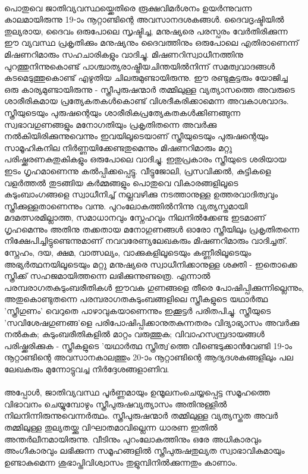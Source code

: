 \paragraph{}പൊതുവെ ജാതിവ്യവസ്ഥയ്ക്കെതിരെ രൂക്ഷവിമർശനം ഉയർന്നുവന്ന കാലമായിരുന്നു 19-ാം നൂറ്റാണ്ടിന്റെ അവസാനദശകങ്ങൾ. ദൈവദൃഷ്ടിയിൽ തുല്യരായ, ദൈവം ഒരുപോലെ സൃഷ്ടിച്ച, മനുഷ്യരെ പരസ്പരം വേർതിരിക്കുന്ന ഈ വ്യവസ്ഥ പ്രകൃതിക്കും മനുഷ്യനും ദൈവത്തിനും ഒരുപോലെ എതിരാണെന്ന് മിഷണറിമാരും സഹചാരികളും വാദിച്ചു. മിഷണറിസ്വാധീനത്തിനു പുറത്തുനിന്നുകൊണ്ട് പാശ്ചാത്യരാഷ്ട്രീയചിന്തയിൽനിന്ന് സമത്വവാദങ്ങൾ കടമെടുത്തുകൊണ്ട് എഴുതിയ ചിലരുമുണ്ടായിരുന്നു. ഈ രണ്ടുകൂട്ടരും യോജിച്ച ഒരു കാര്യമുണ്ടായിരുന്നു - സ്ത്രീപുരുഷന്മാർ തമ്മിലുള്ള വ്യത്യാസത്തെ അവരുടെ ശാരീരികമായ പ്രത്യേകതകൾകൊണ്ട് വിശദീകരിക്കാമെന്ന അവകാശവാദം. സ്ത്രീയുടെയും പുരുഷന്റെയും ശാരീരികപ്രത്യേകതകൾക്കിണങ്ങുന്ന സ്വഭാവഗുണങ്ങളും മനോഗതിയും പ്രകൃതിതന്നെ അവർക്കു നൽകിയിരിക്കുന്നുവെന്നും ഇവയിലൂടെയാണ് സ്ത്രീയുടെയും പുരുഷന്റെയും സാമൂഹികനില നിർണ്ണയിക്കേണ്ടതുമെന്നും മിഷണറിമാരും മറ്റു പരിഷ്ക്കരണകുതുകികളും ഒരുപോലെ വാദിച്ചു. ഇതുപ്രകാരം സ്ത്രീയുടെ ശരിയായ ഇടം ഗൃഹമാണെന്നു കൽപ്പിക്കപ്പെട്ടു. വീട്ടുജോലി, പ്രസവിക്കൽ, കുട്ടികളെ വളർത്തൽ തുടങ്ങിയ കർമ്മങ്ങളും പൊതുവെ വികാരങ്ങളിലൂടെ കുടുംബാംഗങ്ങളെ സ്വാധീനിച്ച് നല്ലവഴിക്കു നടത്താനുള്ള ഉത്തരവാദിത്വവും സ്ത്രീക്കുള്ളതാണെന്നും വന്നു. പുറംലോകത്തിൽനിന്നു വ്യത്യസ്തമായി മദമത്സരമില്ലാത്ത, സമാധാനവും സ്നേഹവും നിലനിൽക്കേണ്ട ഇടമാണ് ഗൃഹമെന്നും അതിനു തക്കതായ മനോഗുണങ്ങൾ ഓരോ സ്ത്രീയിലും പ്രകൃതിതന്നെ നിക്ഷേപിച്ചിട്ടുണ്ടെന്നുമാണ് നവവരേണ്യലേഖകരും മിഷണറിമാരും വാദിച്ചത്. സ്നേഹം, ദയ, ക്ഷമ, വാത്സല്യം, വാക്കുകളിലൂടെയും കണ്ണീരിലൂടെയും അഭ്യർത്ഥനയിലൂടെയും മറ്റു മനുഷ്യരെ സ്വാധീനിക്കാനുള്ള ശക്തി - ഇതൊക്കെ സ്ത്രീക്ക് സഹജമായിത്തന്നെ ലഭിക്കുന്നുണ്ടത്രെ. എന്നാൽ പരമ്പരാഗതകുടുംബരീതികൾ ഈവക ഗുണങ്ങളെ തീരെ പോഷിപ്പിക്കുന്നില്ലെന്നും, അതുകൊണ്ടുതന്നെ പരമ്പരാഗതകുടുംബങ്ങളിലെ സ്ത്രീകളുടെ യഥാർത്ഥ 'സ്ത്രീഗുണം' വെറുതെ പാഴാവുകയാണെന്നും ഇക്കൂട്ടർ പരിതപിച്ചു. സ്ത്രീയുടെ 'സവിശേഷഗുണങ്ങ'ളെ പരിപോഷിപ്പിക്കാനുതകുന്നതരം വിദ്യാഭ്യാസം അവർക്കു നൽകുക; കുടുംബരീതികളിൽ മാറ്റം വരുത്തുക; വിവാഹസമ്പ്രദായങ്ങൾ പരിഷ്ക്കരിക്കുക - സ്ത്രീകളുടെ 'യഥാർത്ഥ സ്ത്രീത്വ'ത്തെ വീണ്ടെടുക്കാൻവേണ്ടി 19-ാം നൂറ്റാണ്ടിന്റെ അവസാനകാലത്തും 20-ാം നൂറ്റാണ്ടിന്റെ ആദ്യദശകങ്ങളിലും പല ലേഖകരും മുന്നോട്ടുവച്ച നിർദ്ദേശങ്ങളാണിവ.
\paragraph{}

അപ്പോൾ, ജാതിവ്യവസ്ഥ പൂർണ്ണമായും ഉന്മൂലനംചെയ്യപ്പെട്ട സമൂഹത്തെ വിഭാവനം ചെയ്യുമ്പോഴും സ്ത്രീപുരുഷവ്യത്യാസം അതിനുള്ളിൽ നിലനിന്നിരുന്നുവെന്നർത്ഥം. സ്ത്രീപുരുഷന്മാർ തമ്മിലുള്ള വ്യത്യസ്തത അവർ തമ്മിലുള്ള തുല്യതയ്ക്കു വിഘാതമാവില്ലെന്ന ധാരണ ഇതിൽ അന്തർലീനമായിരുന്നു. വീടിനും പുറംലോകത്തിനും ഒരേ അധികാരവും അംഗീകാരവും ലഭിക്കുന്ന സമൂഹങ്ങളിൽ സ്ത്രീപുരുഷതുല്യത സ്വാഭാവികമായും ഉണ്ടാകുമെന്ന ശുഭാപ്തിവിശ്വാസം തുളുമ്പിനിൽക്കുന്നതും കാണാം.

